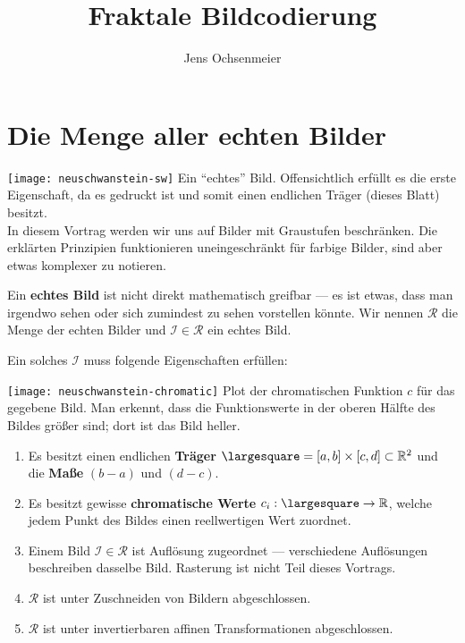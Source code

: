 \documentclass[afourpaper]{latex-classes/handout}
\title{Fraktale Bildcodierung}
\author{Jens Ochsenmeier}
\date{}
\newcommand{\marginrule}{\makebox[\linewidth]{\rule{\linewidth}{0.4pt}}}
\begin{document}
\maketitle

\section{Die Menge aller echten Bilder}

\begin{marginfigure}[8em]
  \texttt{[image: neuschwanstein-sw]}
  \footnotesize{Ein ``echtes'' Bild. Offensichtlich erfüllt es die erste Eigenschaft, da es gedruckt ist und somit einen endlichen Träger (dieses Blatt) besitzt. \\ In diesem Vortrag werden wir uns auf Bilder mit Graustufen beschränken. Die erklärten Prinzipien funktionieren uneingeschränkt für farbige Bilder, sind aber etwas komplexer zu notieren.}
  \marginrule{}
\end{marginfigure}

Ein \textbf{echtes Bild} ist nicht direkt mathematisch greifbar --- es ist etwas, dass man irgendwo sehen oder sich zumindest zu sehen vorstellen könnte. Wir nennen \( \mathcal{R} \) die Menge der echten Bilder und \( \mathcal{I} \in \mathcal{R} \) ein echtes Bild.

Ein solches \( \mathcal{I} \) muss folgende Eigenschaften erfüllen:

\begin{marginfigure}
  \texttt{[image: neuschwanstein-chromatic]}
  \footnotesize{Plot der chromatischen Funktion \( c \) für das gegebene Bild. Man erkennt, dass die Funktionswerte in der oberen Hälfte des Bildes größer sind; dort ist das Bild heller.}
  \marginrule{}
\end{marginfigure}

\begin{enumerate}
  \item Es besitzt einen endlichen \textbf{Träger} \( \largesquare = [a,b] \times [c,d] \subset \R^2 \) und die \textbf{Maße} \( (b-a) \) und \( (d-c) \).

  \item Es besitzt gewisse \textbf{chromatische Werte} \( c_i: \largesquare \to \R \), welche jedem Punkt des Bildes einen reellwertigen Wert zuordnet.

  \item Einem Bild \( \mathcal{I} \in \mathcal{R} \) ist  Auflösung zugeordnet --- verschiedene Auflösungen beschreiben dasselbe Bild. Rasterung ist nicht Teil dieses Vortrags.

  \item \( \mathcal{R} \) ist unter Zuschneiden von Bildern abgeschlossen.
  \item \( \mathcal{R} \) ist unter invertierbaren affinen Transformationen abgeschlossen.
\end{enumerate}
\end{document}
